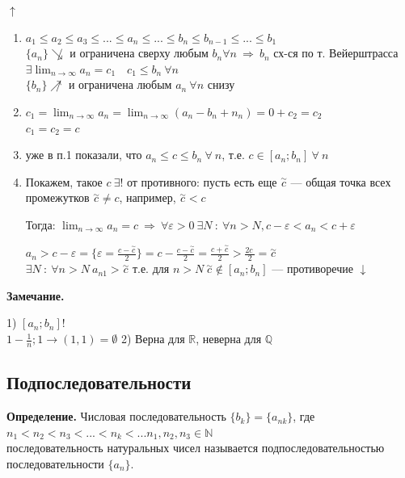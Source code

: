 \documentclass{article}
\begin{document}
\(\uparrow\)
\begin{enumerate}
    \item \(a_1 \leq a_2 \leq a_3 \leq ... \leq a_n \leq ... \leq b_n \leq b_{n-1} \leq ... \leq b_1\)\\
\(\{ a_n \} \not\searrow\) и ограничена сверху любым \(b_n \forall n\ \Rightarrow\ b_n\) сх-ся по т. Вейерштрасса
\\\(\exists \lim_{n \rightarrow \infty}{a_n} = c_1 \quad c_1 \leq b_n \ \forall n\)
\\\(\{b_n\} \not\nearrow\) и ограничена любым \(a_n\ \forall n\) снизу
    \item \( c_1 = \lim_{n \rightarrow \infty} a_n = \lim_{n \rightarrow \infty} (a_n - b_n + n_n) = 0 + c_2 = c_2 \)\\
\( c_1 = c_2 = c \)\\
    \item уже в п.1 показали, что \(a_n \leq c \leq b_n\ \forall\ n\), т.е. \( c \in [a_n; b_n]\ \forall\ n \)
    \item Покажем, такое \( c\ \exists! \) от противного: пусть есть еще \( \overset{\sim}{c} \) --- общая точка всех промежутков \( \overset{\sim}{c} \neq c \), например, \( \overset{\sim}{c} < c \)

Тогда: \(\lim_{n \rightarrow \infty}{a_n} = c\ \Rightarrow\ \forall \varepsilon > 0 \ \exists N\ :\ \forall n > N, c - \varepsilon < a_n < c + \varepsilon\)

\(a_n > c - \varepsilon = \{\varepsilon = \frac{c-\overset{\sim}{c}}{2}\} = c - \frac{c - \overset{\sim}{c}}{2} = \frac{c + \overset{\sim}{c}}{2} > \frac{2c^{~}}{2} = \overset{\sim}{c}\)
\\\(\exists N\ :\ \forall n > N\ a_{n1} > \overset{\sim}{c}\) т.е. для \(n > N\ \overset{\sim}{c} \not\in [a_n; b_n]\) --- противоречие \(\downarrow\)
\end{enumerate}

\textbf{Замечание.}

1) \( [a_n; b_n]! \)\\
\( 1 - \frac{1}{n}; 1 \rightarrow (1, 1) = \emptyset \)
2) Верна для \(\mathbb{R}\), неверна для \(\mathbb{Q}\)

\subsection{Подпоследовательности}
\textbf{Определение.} Числовая последовательность \( \{b_k\} = \{a_{nk}\} \), где \( n_1 < n_2 < n_3 < ... < n_k < ... n_1,n_2,n_3 \in \mathbb{N} \)\\
последовательность натуральных чисел называется подпоследовательностью последовательности \( \{ a_n \} \).
\end{document}
